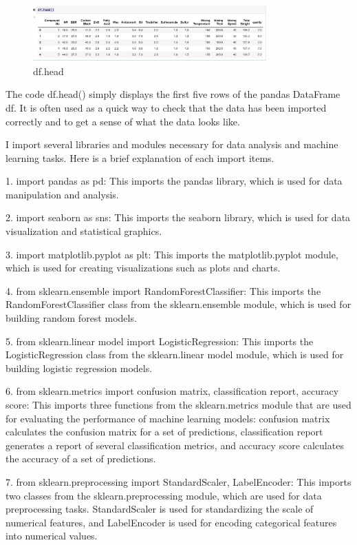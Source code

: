 \documentclass{article}
\begin{document}
\begin{figure}[h!]
  \centering
  \includegraphics[width=0.8\textwidth]{df.head.jpg}
  \caption{df.head}
\end{figure}



\pagebreak
The code df.head() simply displays the first five rows of the pandas DataFrame df. It is often used as a quick way to check that the data has been imported correctly and to get a sense of what the data looks like.


I import several libraries and modules necessary for data analysis and machine learning tasks. Here is a brief explanation of each import items.

1. import pandas as pd: This imports the pandas library, which is used for data manipulation and analysis.

2. import seaborn as sns: This imports the seaborn library, which is used for data visualization and statistical graphics.

3. import matplotlib.pyplot as plt: This imports the matplotlib.pyplot module, which is used for creating visualizations such as plots and charts.

4. from sklearn.ensemble import RandomForestClassifier: This imports the RandomForestClassifier class from the sklearn.ensemble module, which is used for building random forest models.


5. from sklearn.linear model import LogisticRegression: This imports the LogisticRegression class from the sklearn.linear model module, which is used for building logistic regression models.

6. from sklearn.metrics import confusion matrix, classification report, accuracy score: This imports three functions from the sklearn.metrics module that are used for evaluating the performance of machine learning models: confusion matrix calculates the confusion matrix for a set of predictions, classification report generates a report of several classification metrics, and accuracy score calculates the accuracy of a set of predictions.


7. from sklearn.preprocessing import StandardScaler, LabelEncoder: This imports two classes from the sklearn.preprocessing module, which are used for data preprocessing tasks. StandardScaler is used for standardizing the scale of numerical features, and LabelEncoder is used for encoding categorical features into numerical values.
\end{document}
